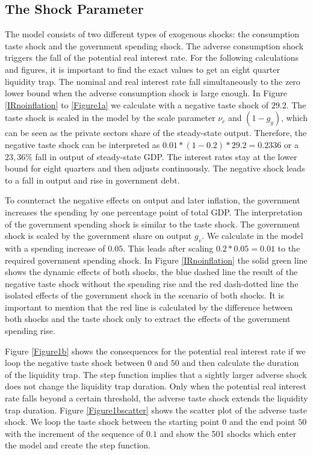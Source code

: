 \documentclass[12pt,a4paper,oneside,titlepage]{article}
\begin{document}
\subsection*{The Shock Parameter}
The model consists of two different types of exogenous shocks: the consumption taste shock and the government spending shock. The adverse consumption shock triggers the fall of the potential real interest rate. For the following calculations and figures, it is important to find the exact values to get an eight quarter liquidity trap. The nominal and real interest rate fall simultaneously to the zero lower bound when the adverse consumption shock is large enough. In Figure \ref{IRnoinflation} to \ref{Figure1a} we calculate with a negative taste shock of $29.2$. The taste shock is scaled in the model by the scale parameter $\nu_c$ and $\left(1- g_y\right)$, which can be seen as the private sectors share of the steady-state output. Therefore, the negative taste shock can be interpreted as $0.01 * \left(1-0.2\right) * 29.2 = 0.2336$ or a $23,36\%$ fall in output of steady-state GDP. The interest rates stay at the lower bound for eight quarters and then adjusts continuously. The negative shock leads to a fall in output and rise in government debt.
\par
\bigskip
To counteract the negative effects on output and later inflation, the government increases the spending by one percentage point of total GDP. The interpretation of the government spending shock is similar to the taste shock.  The government shock is scaled by the government share on output $g_v$. We calculate in the model with a spending increase of $0.05$. This leads after scaling $0.2 * 0.05 = 0.01$ to the required government spending shock.
In Figure \ref{IRnoinflation} the solid green line shows the dynamic effects of both shocks, the blue dashed line the result of the negative taste shock without the spending rise and the red dash-dotted line the isolated effects of the government shock in the scenario of both shocks. It is important to mention that the red line is calculated by the difference between both shocks and the taste shock only to extract the effects of the government spending rise.
\par
\bigskip
Figure \ref{Figure1b} shows the consequences for the potential real interest rate if we loop the negative taste shock between $0$ and $50$ and then calculate the duration of the liquidity trap. The step function implies that a sightly larger adverse shock does not change the liquidity trap duration. Only when the potential real interest rate falls beyond a certain threshold, the adverse taste shock extends the liquidity trap duration. Figure \ref{Figure1bscatter} shows the scatter plot of the adverse taste shock. We loop the taste shock between the starting point $0$ and the end point $50$ with the increment of the sequence of $0.1$ and show the 501 shocks which enter the model and create the step function.
\end{document}
